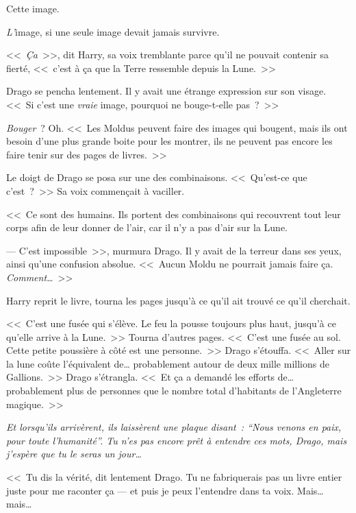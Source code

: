 Cette image.

\emph{L'}image, si une seule image devait jamais survivre.

<<~\emph{Ça}~>>, dit Harry, sa voix tremblante parce qu'il ne pouvait contenir sa fierté, <<~c'est à ça que la Terre ressemble depuis la Lune.~>>

Drago se pencha lentement. Il y avait une étrange expression sur son visage. <<~Si c'est une \emph{vraie} image, pourquoi ne bouge-t-elle pas~?~>>

\emph{Bouger}~? Oh. <<~Les Moldus peuvent faire des images qui bougent, mais ils ont besoin d'une plus grande boite pour les montrer, ils ne peuvent pas encore les faire tenir sur des pages de livres.~>>

Le doigt de Drago se posa sur une des combinaisons. <<~Qu'est-ce que c'est~?~>> Sa voix commençait à vaciller.

<<~Ce sont des humains. Ils portent des combinaisons qui recouvrent tout leur corps afin de leur donner de l'air, car il n'y a pas d'air sur la Lune.

--- C'est impossible~>>, murmura Drago. Il y avait de la terreur dans ses yeux, ainsi qu'une confusion absolue. <<~Aucun Moldu ne pourrait jamais faire ça. \emph{Comment…}~>>

Harry reprit le livre, tourna les pages jusqu'à ce qu'il ait trouvé ce qu'il cherchait.

<<~C'est une fusée qui s'élève. Le feu la pousse toujours plus haut, jusqu'à ce qu'elle arrive à la Lune.~>> Tourna d'autres pages. <<~C'est une fusée au sol. Cette petite poussière à côté est une personne.~>> Drago s'étouffa. <<~Aller sur la lune coûte l'équivalent de… probablement autour de deux mille millions de Gallions.~>> Drago s'étrangla. <<~Et ça a demandé les efforts de… probablement plus de personnes que le nombre total d'habitants de l'Angleterre magique.~>>

\emph{Et lorsqu'ils arrivèrent, ils laissèrent une plaque disant~: “Nous venons en paix, pour toute l'humanité”. Tu n'es pas encore prêt à entendre ces mots, Drago, mais j'espère que tu le seras un jour…}

<<~Tu dis la vérité, dit lentement Drago. Tu ne fabriquerais pas un livre entier juste pour me raconter ça — et puis je peux l'entendre dans ta voix. Mais… mais…

